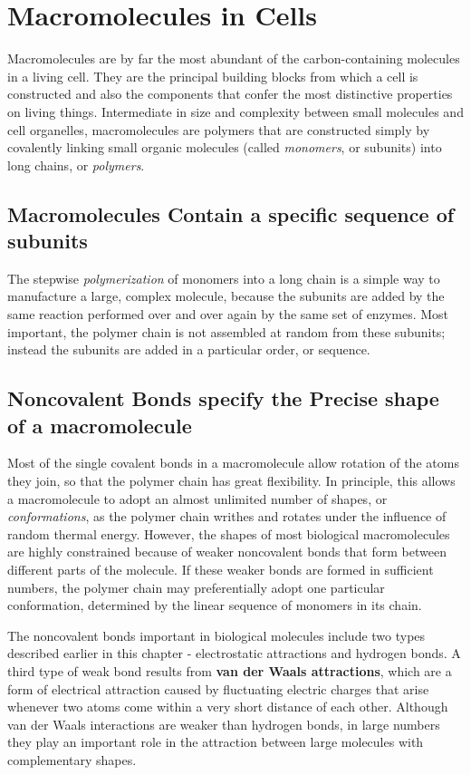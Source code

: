 \section{Macromolecules in Cells}

Macromolecules are by far the most abundant
of the carbon-containing molecules in a living cell. They
are the principal building blocks from which a cell is constructed and
also the components that confer the most distinctive properties on living things.
Intermediate in size and complexity between small molecules
and cell organelles, macromolecules are polymers that are constructed
simply by covalently linking small organic molecules (called \textit{monomers},
or subunits) into long chains, or \textit{polymers}.

\subsection{Macromolecules Contain a specific sequence of subunits}

The stepwise \textit{polymerization} of monomers into a long chain is a simple
way to manufacture a large, complex molecule, because the subunits are
added by the same reaction performed over and over again by the same
set of enzymes. Most important, the polymer chain is
not assembled at random from these subunits; instead the subunits are
added in a particular order, or sequence.

\subsection{Noncovalent Bonds specify the Precise shape of a macromolecule}

Most of the single covalent bonds in a macromolecule allow rotation of
the atoms they join, so that the polymer chain has great flexibility. In principle, 
this allows a macromolecule to adopt an almost unlimited number
of shapes, or \textit{conformations}, as the polymer chain writhes and rotates
under the influence of random thermal energy. However, the shapes
of most biological macromolecules are highly constrained because of
weaker noncovalent bonds that form between different parts of the
molecule. If these weaker bonds are formed in sufficient numbers, the
polymer chain may preferentially adopt one particular conformation,
determined by the linear sequence of monomers in its chain.

The noncovalent bonds important in biological molecules include two
types described earlier in this chapter - electrostatic attractions and hydrogen 
bonds.
A third type of weak bond results from \textbf{van der Waals attractions}, which
are a form of electrical attraction caused by fluctuating electric charges
that arise whenever two atoms come within a very short distance of each
other. Although van der Waals interactions are weaker than hydrogen
bonds, in large numbers they play an important role in the attraction
between large molecules with complementary shapes.

